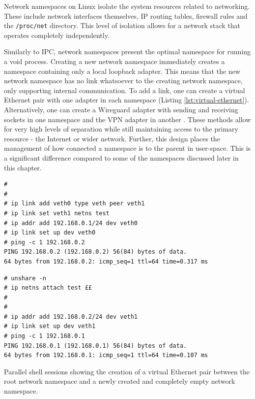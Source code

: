 \documentclass[12pt,a4paper,twoside]{report}
\begin{document}
Network namespaces on Linux isolate the system resources related to networking. These include network interfaces themselves, IP routing tables, firewall rules and the \texttt{/proc/net} directory. This level of isolation allows for a network stack that operates completely independently.

Similarly to IPC, network namespaces present the optimal namespace for running a void process. Creating a new network namespace immediately creates a namespace containing only a local loopback adapter. This means that the new network namespace has no link whatsoever to the creating network namespace, only supporting internal communication. To add a link, one can create a virtual Ethernet pair with one adapter in each namespace (Listing \ref{lst:virtual-ethernet}). Alternatively, one can create a Wireguard adapter with sending and receiving sockets in one namespace and the VPN adapter in another \citep[§7.3]{donenfeld_wireguard_2017}. These methods allow for very high levels of separation while still maintaining access to the primary resource - the Internet or wider network. Further, this design places the management of how connected a namespace is to the parent in user-space. This is a significant difference compared to some of the namespaces discussed later in this chapter.

\begin{listing}
\begin{minipage}{.49\textwidth}

\begin{verbatim}
#
#
# ip link add veth0 type veth peer veth1
# ip link set veth1 netns test
# ip addr add 192.168.0.1/24 dev veth0
# ip link set up dev veth0
# ping -c 1 192.168.0.2
PING 192.168.0.2 (192.168.0.2) 56(84) bytes of data.
64 bytes from 192.168.0.2: icmp_seq=1 ttl=64 time=0.317 ms
\end{verbatim}

\end{minipage}\hfill
\begin{minipage}{.49\textwidth}

\begin{verbatim}
# unshare -n
# ip netns attach test ££
#
#
# ip addr add 192.168.0.2/24 dev veth1
# ip link set up dev veth1
# ping -c 1 192.168.0.1
PING 192.168.0.1 (192.168.0.1) 56(84) bytes of data.
64 bytes from 192.168.0.1: icmp_seq=1 ttl=64 time=0.107 ms
\end{verbatim}

\end{minipage}

\caption{Parallel shell sessions showing the creation of a virtual Ethernet pair between the root network namespace and a newly created and completely empty network namespace.}
\label{lst:virtual-ethernet}
\end{listing}
\end{document}
